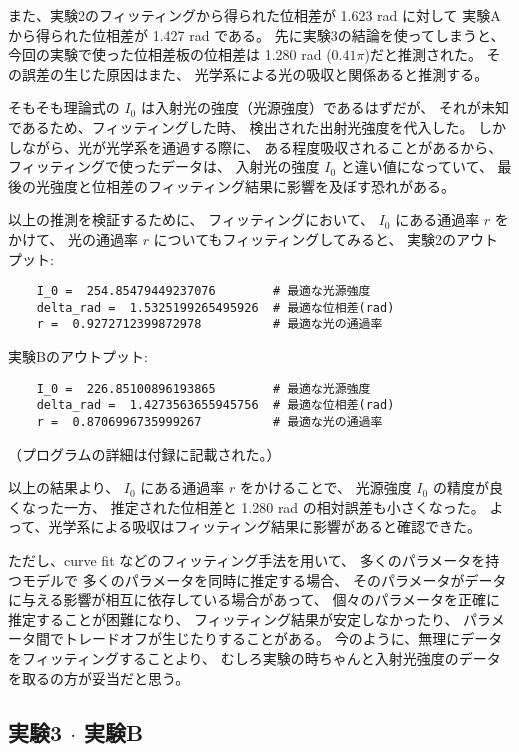 \documentclass{article}
\begin{document}
\begin{spacing}{1.2}
    また、実験2のフィッティングから得られた位相差が 1.623 rad に対して
    実験Aから得られた位相差が 1.427 rad である。
    先に実験3の結論を使ってしまうと、
    今回の実験で使った位相差板の位相差は 1.280 rad ($0.41\pi$)だと推測された。
    その誤差の生じた原因はまた、
    光学系による光の吸収と関係あると推測する。

    そもそも理論式の $I_0$ は入射光の強度（光源強度）であるはずだが、
    それが未知であるため、フィッティングした時、
    検出された出射光強度を代入した。
    しかしながら、光が光学系を通過する際に、
    ある程度吸収されることがあるから、
    フィッティングで使ったデータは、
    入射光の強度 $I_0$ と違い値になっていて、
    最後の光強度と位相差のフィッティング結果に影響を及ぼす恐れがある。

    以上の推測を検証するために、
    フィッティングにおいて、
    $I_0$ にある通過率 $r$ をかけて、
    光の通過率 $r$ についてもフィッティングしてみると、
    実験2のアウトプット:
    \begin{lstlisting}
    I_0 =  254.85479449237076        # 最適な光源強度
    delta_rad =  1.5325199265495926  # 最適な位相差(rad)
    r =  0.9272712399872978          # 最適な光の通過率
    \end{lstlisting}
    実験Bのアウトプット:
    \begin{lstlisting}
    I_0 =  226.85100896193865        # 最適な光源強度
    delta_rad =  1.4273563655945756  # 最適な位相差(rad)
    r =  0.8706996735999267          # 最適な光の通過率
    \end{lstlisting}
    （プログラムの詳細は付録に記載された。）

    以上の結果より、
    $I_0$ にある通過率 $r$ をかけることで、
    光源強度 $I_0$ の精度が良くなった一方、
    推定された位相差と 1.280 rad の相対誤差も小さくなった。
    よって、光学系による吸収はフィッティング結果に影響があると確認できた。

    ただし、curve fit などのフィッティング手法を用いて、
    多くのパラメータを持つモデルで
    多くのパラメータを同時に推定する場合、
    そのパラメータがデータに与える影響が相互に依存している場合があって、
    個々のパラメータを正確に推定することが困難になり、
    フィッティング結果が安定しなかったり、
    パラメータ間でトレードオフが生じたりすることがある。
    今のように、無理にデータをフィッティングすることより、
    むしろ実験の時ちゃんと入射光強度のデータを取るの方が妥当だと思う。
\end{spacing}

\newpage
\subsection{実験3 $\cdot$ 実験B}
\end{document}
